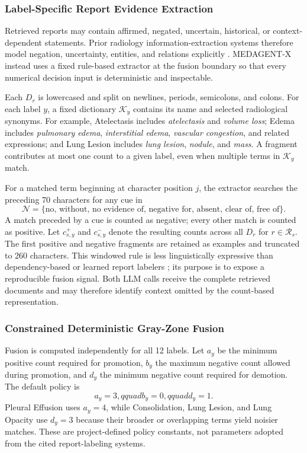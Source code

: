 \subsubsection{Label-Specific Report Evidence Extraction}

Retrieved reports may contain affirmed, negated, uncertain, historical, or context-dependent statements. Prior radiology information-extraction systems therefore model negation, uncertainty, entities, and relations explicitly \cite{peng2018negbio,irvin2019chexpert,smit2020chexbert,jain2021radgraph}. MEDAGENT-X instead uses a fixed rule-based extractor at the fusion boundary so that every numerical decision input is deterministic and inspectable.

Each $D_r$ is lowercased and split on newlines, periods, semicolons, and colons. For each label $y$, a fixed dictionary $\mathcal K_y$ contains its name and selected radiological synonyms. For example, Atelectasis includes \emph{atelectasis} and \emph{volume loss}; Edema includes \emph{pulmonary edema}, \emph{interstitial edema}, \emph{vascular congestion}, and related expressions; and Lung Lesion includes \emph{lung lesion}, \emph{nodule}, and \emph{mass}. A fragment contributes at most one count to a given label, even when multiple terms in $\mathcal K_y$ match.

For a matched term beginning at character position $j$, the extractor searches the preceding 70 characters for any cue in
\[
\mathcal N=\{\text{no, without, no evidence of, negative for, absent, clear of, free of}\}.
\]
A match preceded by a cue is counted as negative; every other match is counted as positive. Let $c^+_{s,y}$ and $c^-_{s,y}$ denote the resulting counts across all $D_r$ for $r\in\mathcal R_s$. The first positive and negative fragments are retained as examples and truncated to 260 characters. This windowed rule is less linguistically expressive than dependency-based or learned report labelers \cite{peng2018negbio,smit2020chexbert}; its purpose is to expose a reproducible fusion signal. Both LLM calls receive the complete retrieved documents and may therefore identify context omitted by the count-based representation.

\subsubsection{Constrained Deterministic Gray-Zone Fusion}

Fusion is computed independently for all 12 labels. Let $a_y$ be the minimum positive count required for promotion, $b_y$ the maximum negative count allowed during promotion, and $d_y$ the minimum negative count required for demotion. The default policy is
\[
a_y=3,qquad b_y=0,qquad d_y=1.
\]
Pleural Effusion uses $a_y=4$, while Consolidation, Lung Lesion, and Lung Opacity use $d_y=3$ because their broader or overlapping terms yield noisier matches. These are project-defined policy constants, not parameters adopted from the cited report-labeling systems.

